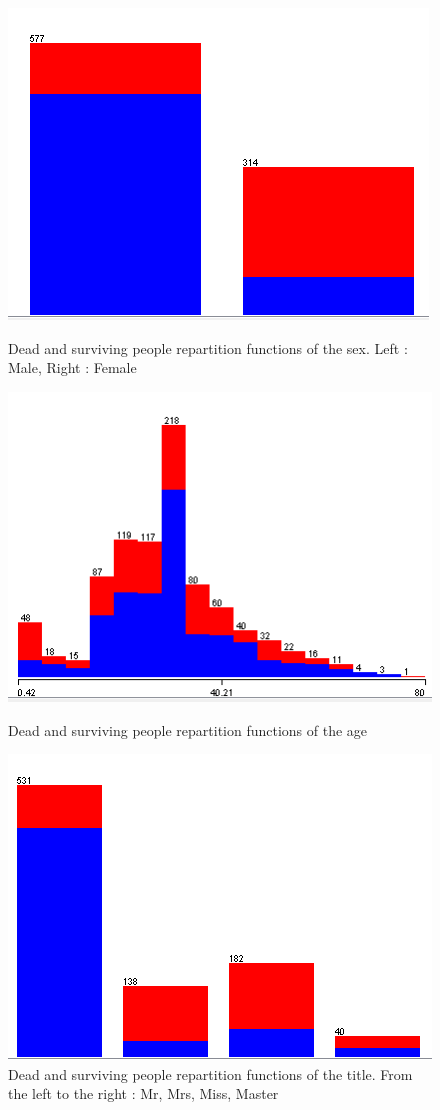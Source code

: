 \documentclass[11pt,a4paper,portrait]{article}
\begin{document}
\begin{figure}[!ht]
	\centering
	\begin{minipage}[t]{5cm}
		\includegraphics[scale=0.6]{sexsur.png}
		\caption{Dead and surviving people repartition functions of the sex. Left : Male, Right : Female}
		\label{sexsur}
	\end{minipage}
	\begin{minipage}[t]{5cm}
		\includegraphics[scale=0.6]{agesur.png}
		\caption{Dead and surviving people repartition functions of the age}
		\label{agesur}
	\end{minipage}
	\begin{minipage}[t]{5cm}
		\includegraphics[scale=0.6]{titlesur.png}
		\caption{Dead and surviving people repartition functions of the title.
	From the left to the right : Mr, Mrs, Miss, Master}
		\label{titlesur}
	\end{minipage}	
\end{figure}
\end{document}
